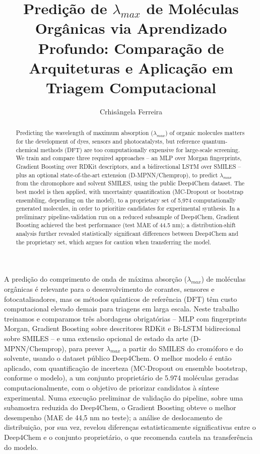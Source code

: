 \documentclass[12pt]{article}
\title{Predição de $\lambda_{max}$ de Moléculas Orgânicas via Aprendizado Profundo: Comparação de Arquiteturas e Aplicação em Triagem Computacional}
\author{Crhisângela Ferreira\inst{1}}
\begin{document}
\maketitle

\begin{resumo}
A predição do comprimento de onda de máxima absorção ($\lambda_{max}$) de moléculas orgânicas é relevante para o desenvolvimento de corantes, sensores e fotocatalisadores, mas os métodos quânticos de referência (DFT) têm custo computacional elevado demais para triagens em larga escala. Neste trabalho treinamos e comparamos três abordagens obrigatórias -- MLP com fingerprints Morgan, Gradient Boosting sobre descritores RDKit e Bi-LSTM bidirecional sobre SMILES -- e uma extensão opcional de estado da arte (D-MPNN/Chemprop), para prever $\lambda_{max}$ a partir do SMILES do cromóforo e do solvente, usando o dataset público Deep4Chem. O melhor modelo é então aplicado, com quantificação de incerteza (MC-Dropout ou ensemble bootstrap, conforme o modelo), a um conjunto proprietário de 5.974 moléculas geradas computacionalmente, com o objetivo de priorizar candidatos à síntese experimental. Numa execução preliminar de validação do pipeline, sobre uma subamostra reduzida do Deep4Chem, o Gradient Boosting obteve o melhor desempenho (MAE de 44,5 nm no teste); a análise de deslocamento de distribuição, por sua vez, revelou diferenças estatisticamente significativas entre o Deep4Chem e o conjunto proprietário, o que recomenda cautela na transferência do modelo.
\end{resumo}

\begin{abstract}
Predicting the wavelength of maximum absorption ($\lambda_{max}$) of organic molecules matters for the development of dyes, sensors and photocatalysts, but reference quantum-chemical methods (DFT) are too computationally expensive for large-scale screening. We train and compare three required approaches -- an MLP over Morgan fingerprints, Gradient Boosting over RDKit descriptors, and a bidirectional LSTM over SMILES -- plus an optional state-of-the-art extension (D-MPNN/Chemprop), to predict $\lambda_{max}$ from the chromophore and solvent SMILES, using the public Deep4Chem dataset. The best model is then applied, with uncertainty quantification (MC-Dropout or bootstrap ensembling, depending on the model), to a proprietary set of 5,974 computationally generated molecules, in order to prioritize candidates for experimental synthesis. In a preliminary pipeline-validation run on a reduced subsample of Deep4Chem, Gradient Boosting achieved the best performance (test MAE of 44.5 nm); a distribution-shift analysis further revealed statistically significant differences between Deep4Chem and the proprietary set, which argues for caution when transferring the model.
\end{abstract}
\end{document}
